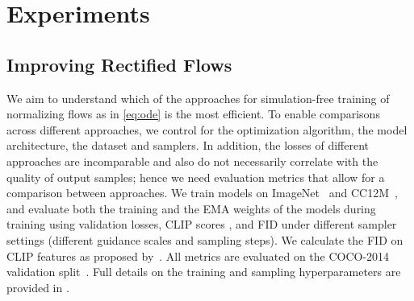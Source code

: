 \section{Experiments}
\label{sec:experiments}
%
\tabglobalrank
\tabsota

\subsection{Improving Rectified Flows}
\label{subsec:improvingrfs}
We aim to understand which of the approaches for simulation-free training of
normalizing flows as in \eqref{eq:ode} is the most efficient.  To enable
comparisons across different approaches, we control for the
optimization algorithm, the model architecture, the dataset and samplers. In
addition, the losses of different approaches are incomparable and also do not
necessarily correlate with the quality of output samples; hence we need
evaluation metrics that allow for a comparison between approaches.
We train models on ImageNet~\cite{Russakovsky2014ImageNetLS} and CC12M~\cite{Changpinyo2021Conceptual1P}, 
and evaluate both the training and the EMA weights of
the models during training using validation losses, CLIP scores
\cite{radford2021learning,Hessel_2021}, and
FID \cite{heusel2017gans} under different sampler settings (different guidance scales and sampling steps). 
We calculate the FID on CLIP features as proposed by~\cite{sauer2021projected}. 
All metrics are evaluated on the COCO-2014 validation split~\cite{Lin_2014}.
Full details on the training and sampling hyperparameters are provided in .

%
%
%
%
%
%
%
%
%
%
%
%
%

%
%
%
%
%
%
%
%
%

%
%
%
%
%
%
%
%
%

%
%
%
%
%
%
%

%
%
%

%
%
%
%
%
%
%
%

